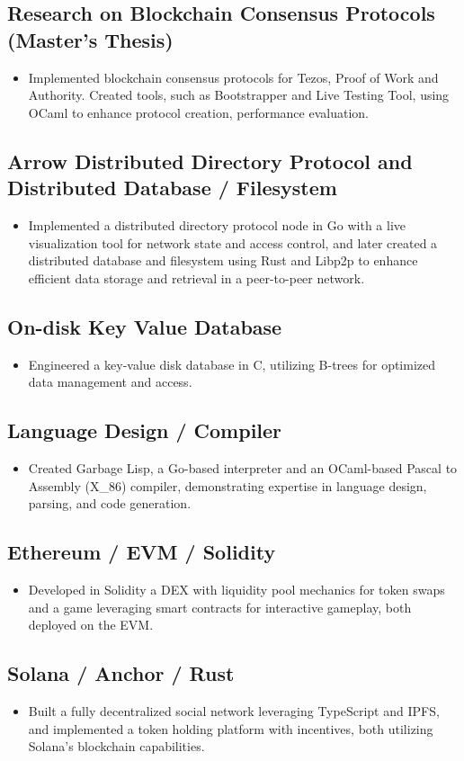 \documentclass[a4paper, 12pt]{article}
\begin{document}
\subsection{Research on Blockchain Consensus Protocols (Master's Thesis)}
\begin{itemize}
  \item Implemented blockchain consensus protocols for Tezos, Proof of Work and Authority. Created tools, such as Bootstrapper and Live Testing Tool, using OCaml to enhance protocol creation, performance evaluation.
\end{itemize}

\subsection{Arrow Distributed Directory Protocol and Distributed Database / Filesystem}
\begin{itemize}
\item Implemented a distributed directory protocol node in Go with a live visualization tool for network state and access control, and later created a distributed database and filesystem using Rust and Libp2p to enhance efficient data storage and retrieval in a peer-to-peer network.
\end{itemize}


\subsection{On-disk Key Value Database}
\begin{itemize}
  \item Engineered a key-value disk database in C, utilizing B-trees for optimized data management and access.
\end{itemize}

\subsection{Language Design / Compiler}
\begin{itemize}
  \item Created Garbage Lisp, a Go-based interpreter and an OCaml-based Pascal to Assembly (X\_86) compiler, demonstrating expertise in language design, parsing, and code generation.
\end{itemize}

\subsection{Ethereum / EVM / Solidity}
\begin{itemize}
  \item Developed in Solidity a DEX with liquidity pool mechanics for token swaps and a game leveraging smart contracts for interactive gameplay, both deployed on the EVM. 
\end{itemize}


\subsection{Solana / Anchor / Rust}
\begin{itemize}
  \item Built a fully decentralized social network leveraging TypeScript and IPFS, and implemented a token holding platform with incentives, both utilizing Solana's blockchain capabilities.
\end{itemize}
\end{document}
